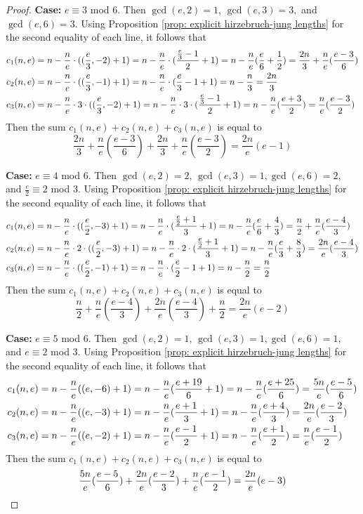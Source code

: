 \documentclass[12pt]{amsart}
\numberwithin{equation}{section}
\theoremstyle{definition}
\let\L\relax
\DeclareMathOperator{\L}{L}
\begin{document}
\begin{proof}
    \textbf{Case:} $e\equiv 3$ mod $6$. Then $\gcd(e,2)=1$, $\gcd(e,3)=3,$ and $\gcd(e,6)=3$. Using Proposition \ref{prop: explicit hirzebruch-jung lengths} for the second equality of each line, it follows that
    \begin{align*}
        c_1(n,e)&=n-\frac{n}{e}\cdot(\L(\frac{e}{3},-2)+1)=n-\frac{n}{e}\cdot(\frac{\frac{e}{3}-1}{2}+1)=n-\frac{n}{e}(\frac{e}{6}+\frac{1}{2})=\frac{2n}{3}+\frac{n}{e}(\frac{e-3}{6})\\
        c_2(n,e)&=n-\frac{n}{e}\cdot(\L(\frac{e}{3},-1)+1)=n-\frac{n}{e}\cdot(\frac{e}{3}-1+1)=n-\frac{n}{3}=\frac{2n}{3}\\
        c_3(n,e)&=n-\frac{n}{e}\cdot3\cdot(\L(\frac{e}{3},-2)+1)=n-\frac{n}{e}\cdot 3\cdot(\frac{\frac{e}{3}-1}{2}+1)=n-\frac{n}{e}(\frac{e+3}{2})=\frac{n}{e}(\frac{e-3}{2})
    \end{align*}
    Then the sum $c_1(n,e)+c_2(n,e)+c_3(n,e)$ is equal to
    \[\frac{2n}{3}+\frac{n}{e}(\frac{e-3}{6})+\frac{2n}{3}+\frac{n}{e}(\frac{e-3}{2})=\frac{2n}{e}(e-1)\]

    \textbf{Case:} $e\equiv 4$ mod $6$. Then $\gcd(e,2)=2$, $\gcd(e,3)=1,\gcd(e,6)=2,$ and $\frac{e}{2}\equiv 2$ mod $3$. Using Proposition \ref{prop: explicit hirzebruch-jung lengths} for the second equality of each line, it follows that
    \begin{align*}
        c_1(n,e)&=n-\frac{n}{e}\cdot(\L(\frac{e}{2},-3)+1)=n-\frac{n}{e}\cdot(\frac{\frac{e}{2}+1}{3}+1)=n-\frac{n}{e}(\frac{e}{6}+\frac{4}{3})=\frac{n}{2}+\frac{n}{e}(\frac{e-4}{3})\\
        c_2(n,e)&=n-\frac{n}{e}\cdot2\cdot(\L(\frac{e}{2},-3)+1)=n-\frac{n}{e}\cdot2\cdot(\frac{\frac{e}{2}+1}{3}+1)=n-\frac{n}{e}(\frac{e}{3}+\frac{8}{3})=\frac{2n}{e}(\frac{e-4}{3})\\
        c_3(n,e)&=n-\frac{n}{e}\cdot(\L(\frac{e}{2},-1)+1)=n-\frac{n}{e}\cdot(\frac{e}{2}-1+1)=n-\frac{n}{2}=\frac{n}{2}
    \end{align*}
    Then the sum $c_1(n,e)+c_2(n,e)+c_3(n,e)$ is equal to
    \[\frac{n}{2}+\frac{n}{e}(\frac{e-4}{3})+\frac{2n}{e}(\frac{e-4}{3})+\frac{n}{2}=\frac{2n}{e}(e-2)\]

    \textbf{Case:} $e\equiv 5$ mod $6$. Then $\gcd(e,2)=1$, $\gcd(e,3)=1,\gcd(e,6)=1,$ and $e\equiv 2$ mod $3$. Using Proposition \ref{prop: explicit hirzebruch-jung lengths} for the second equality of each line, it follows that
    \begin{align*}
    c_1(n,e)&=n-\frac{n}{e}(\L(e,-6)+1)=n-\frac{n}{e}(\frac{e+19}{6}+1)=n-\frac{n}{e}(\frac{e+25}{6})=\frac{5n}{e}(\frac{e-5}{6})\\
    c_2(n,e)&=n-\frac{n}{e}(\L(e,-3)+1)=n-\frac{n}{e}(\frac{e+1}{3}+1)=n-\frac{n}{e}(\frac{e+4}{3})=\frac{2n}{e}(\frac{e-2}{3})\\
    c_3(n,e)&=n-\frac{n}{e}(\L(e,-2)+1)=n-\frac{n}{e}(\frac{e-1}{2}+1)=n-\frac{n}{e}(\frac{e+1}{2})=\frac{n}{e}(\frac{e-1}{2})
    \end{align*}
    Then the sum $c_1(n,e)+c_2(n,e)+c_3(n,e)$ is equal to
    \[\frac{5n}{e}(\frac{e-5}{6})+\frac{2n}{e}(\frac{e-2}{3})+\frac{n}{e}(\frac{e-1}{2})=\frac{2n}{e}(e-3)\qedhere\]
\end{proof}
\end{document}
